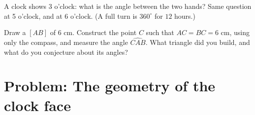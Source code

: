 \begin{exercise}[$\star\star$]\label{exo:g6:lines:11}
A clock shows 3 o'clock: what is the angle between the two hands? Same
question at 5 o'clock, and at 6 o'clock. (A full turn is $360^\circ$
for $12$ hours.)
\end{exercise}

\begin{exercise}[$\star\star\star$]\label{exo:g6:lines:12}
Draw a  $[AB]$ of $6$ cm. Construct the point $C$ such that
$AC = BC = 6$ cm, using only the compass, and measure the angle
$\widehat{CAB}$. What triangle did you build, and what do you
conjecture about its angles?
\end{exercise}

\section{Problem: The geometry of the clock face}

